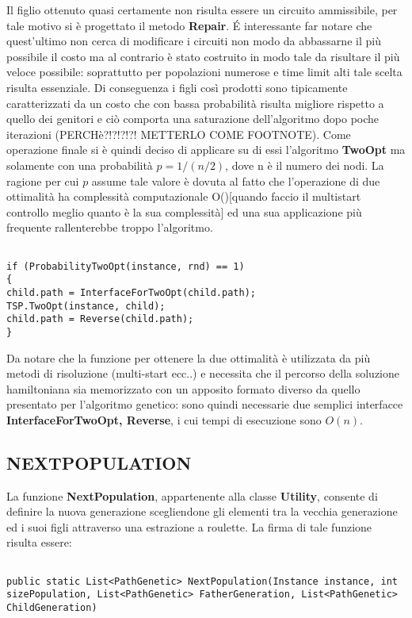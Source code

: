 \documentclass[11pt]{article}
\begin{document}
Il figlio ottenuto quasi certamente non risulta essere un circuito ammissibile, per tale motivo si è progettato il metodo \textbf{Repair}. \'E interessante far notare che quest'ultimo non cerca di modificare i circuiti non modo da abbassarne il più possibile il costo ma al contrario è stato costruito in modo tale da risultare il più veloce possibile: soprattutto per popolazioni numerose e time limit alti tale scelta risulta essenziale. Di conseguenza i figli così prodotti sono tipicamente caratterizzati da un costo che con bassa probabilità risulta migliore rispetto a quello dei genitori e ciò comporta una saturazione dell'algoritmo dopo poche iterazioni (PERCHè?!?!?!?! METTERLO COME FOOTNOTE). Come operazione finale si è quindi deciso di applicare su di essi l'algoritmo \textbf{TwoOpt} ma solamente con una probabilità $p = 1 / (n/2)$, dove n è il numero dei nodi. La ragione per cui $p$ assume tale valore è dovuta al fatto che l'operazione di due ottimalità ha complessità computazionale O()[quando faccio il multistart controllo meglio quanto è la sua complessità] ed una sua applicazione più frequente rallenterebbe troppo l'algoritmo.

\begin{lstlisting}

if (ProbabilityTwoOpt(instance, rnd) == 1)
{
child.path = InterfaceForTwoOpt(child.path);
TSP.TwoOpt(instance, child);
child.path = Reverse(child.path);
}

\end{lstlisting}

Da notare che la funzione per ottenere la due ottimalità è utilizzata da più metodi di risoluzione (multi-start ecc..) e necessita che il percorso della soluzione hamiltoniana sia memorizzato con un apposito formato diverso da quello presentato per l'algoritmo genetico: sono quindi necessarie due semplici interfacce \textbf{InterfaceForTwoOpt, Reverse}, i cui tempi di esecuzione sono $O(n)$.

\subsection*{NEXTPOPULATION}
\label{sec:NextPopulationS}

La funzione \textbf{NextPopulation}, appartenente alla classe \textbf{Utility}, consente di definire la nuova generazione scegliendone gli elementi tra la vecchia generazione ed i suoi figli attraverso una estrazione a roulette. La firma di tale funzione risulta essere:

\begin{lstlisting}

public static List<PathGenetic> NextPopulation(Instance instance, int sizePopulation, List<PathGenetic> FatherGeneration, List<PathGenetic> ChildGeneration)

\end{lstlisting}
\end{document}
